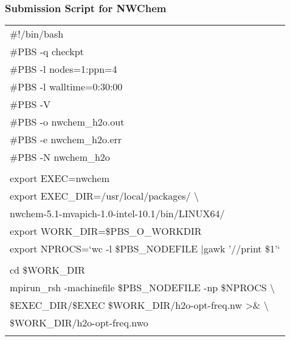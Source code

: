 \documentclass[slidestop,mathserif,compress,xcolor=svgnames]{beamer}
\newenvironment{eblock}[0]
{
\begin{beamerboxesrounded}[upper=uppercol2,lower=lowercol2,shadow=true]}
{\end{beamerboxesrounded}}
\begin{document}
\begin{frame}
  \frametitle{\small Submission Script for NWChem}
  \vspace{-0.3cm}
  \begin{eblock}{}
    \begin{tabular}{l}
      \#!/bin/bash\\
      \#PBS -q checkpt\\
      \#PBS -l nodes=1:ppn=4\\
      \#PBS -l walltime=0:30:00\\
      \#PBS -V\\
      \#PBS -o nwchem\_h2o.out\\
      \#PBS -e nwchem\_h2o.err\\
      \#PBS -N nwchem\_h2o \\
      \\
      export EXEC=nwchem\\
      export EXEC\_DIR=/usr/local/packages/ \textbackslash \\
	\quad nwchem-5.1-mvapich-1.0-intel-10.1/bin/LINUX64/\\
      export WORK\_DIR=\$PBS\_O\_WORKDIR\\
      export NPROCS=`wc -l \$PBS\_NODEFILE |gawk '//{print \$1}'` \\
      \\
      cd \$WORK\_DIR\\
      mpirun\_rsh -machinefile \$PBS\_NODEFILE -np \$NPROCS \textbackslash \\
	\quad \$EXEC\_DIR/\$EXEC \$WORK\_DIR/h2o-opt-freq.nw >\& \textbackslash \\
	\quad \$WORK\_DIR/h2o-opt-freq.nwo\\
      \\
    \end{tabular}
  \end{eblock}
\end{frame}
\end{document}
